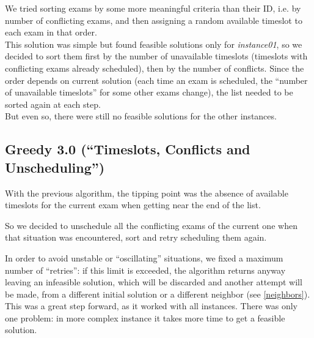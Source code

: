 \documentclass[11pt, a4paper, leqno]{article}
\begin{document}
	We tried sorting exams by some more meaningful criteria than their ID, i.e. by number of conflicting exams, and then assigning a random available timeslot to each exam in that order.\\
	This solution was simple but found feasible solutions only for \textit{instance01}, so we decided to sort them first by the number of unavailable timeslots (timeslots with conflicting exams already scheduled), then by the number of conflicts. Since the order depends on current solution (each time an exam is scheduled, the ``number of unavailable timeslots'' for some other exams change), the list needed to be sorted again at each step.\\
	But even so, there were still no feasible solutions for the other instances.
	
	\subsection{Greedy 3.0 (``Timeslots, Conflicts and Unscheduling'')}
	
	With the previous algorithm, the tipping point was the absence of available timeslots for the current exam when getting near the end of the list.
	
	So we decided to unschedule all the conflicting exams of the current one when that situation was encountered, sort and retry scheduling them again.
	
	In order to avoid unstable or ``oscillating'' situations, we fixed a maximum number of ``retries'': if this limit is exceeded, the algorithm returns anyway leaving an infeasible solution, which will be discarded and another attempt will be made, from a different initial solution or a different neighbor (see \ref{neighbors}). This was a great step forward, as it worked with all instances. There was only one problem: in more complex instance it takes more time to get a feasible solution.
	
\end{document}
